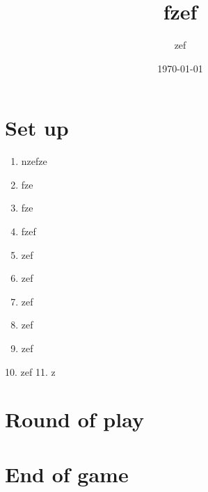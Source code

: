 \documentclass{article}%
\title{fzef}%
\author{zef}%
\date{\today}%
\begin{document}
%
\pagestyle{empty}%
\normalsize%
\maketitle%
\section{ Set up
}%
\label{sec:Setup}%
\begin{enumerate}%
\item%
 nzefze
%
\item%
 fze
%
\item%
 fze
%
\item%
 fzef
%
\item%
 zef
%
\item%
 zef
%
\item%
 zef
%
\item%
 zef
%
\item%
 zef
%
\end{enumerate}%
10. zef
%
11. z


%
\section{ Round of play
}%
\label{sec:Roundofplay}%

%
\section{ End of game}%
\label{sec:Endofgame}%

%
\end{document}
